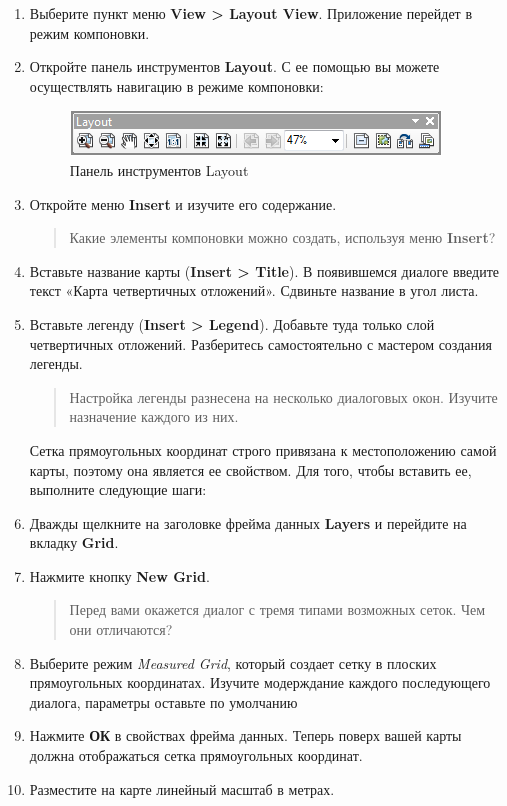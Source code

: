 \documentclass[]{book}
\theoremstyle{definition}
\theoremstyle{definition}
\theoremstyle{definition}
\theoremstyle{remark}
\begin{document}
\begin{enumerate}
\def\labelenumi{\arabic{enumi}.}
\item
  Выберите пункт меню \textbf{View \textgreater{} Layout View}.
  Приложение перейдет в режим компоновки.
\item
  Откройте панель инструментов \textbf{Layout}. С ее помощью вы можете
  осуществлять навигацию в режиме компоновки:

  \begin{figure}
  \centering
  \includegraphics{images/Ex01/image20.png}
  \caption{Панель инструментов Layout}
  \end{figure}
\item
  Откройте меню \textbf{Insert} и изучите его содержание.

  \begin{quote}
  Какие элементы компоновки можно создать, используя меню
  \textbf{Insert}?
  \end{quote}
\item
  Вставьте название карты (\textbf{Insert \textgreater{} Title}). В
  появившемся диалоге введите текст «Карта четвертичных отложений».
  Сдвиньте название в угол листа.
\item
  Вставьте легенду (\textbf{Insert \textgreater{} Legend}). Добавьте
  туда только слой четвертичных отложений. Разберитесь самостоятельно с
  мастером создания легенды.

  \begin{quote}
  Настройка легенды разнесена на несколько диалоговых окон. Изучите
  назначение каждого из них.
  \end{quote}

  Сетка прямоугольных координат строго привязана к местоположению самой
  карты, поэтому она является ее свойством. Для того, чтобы вставить ее,
  выполните следующие шаги:
\item
  Дважды щелкните на заголовке фрейма данных \textbf{Layers} и перейдите
  на вкладку \textbf{Grid}.
\item
  Нажмите кнопку \textbf{New Grid}.

  \begin{quote}
  Перед вами окажется диалог с тремя типами возможных сеток. Чем они
  отличаются?
  \end{quote}
\item
  Выберите режим \emph{Measured Grid}, который создает сетку в плоских
  прямоугольных координатах. Изучите модерждание каждого последующего
  диалога, параметры оставьте по умолчанию
\item
  Нажмите \textbf{ОК} в свойствах фрейма данных. Теперь поверх вашей
  карты должна отображаться сетка прямоугольных координат.
\item
  Разместите на карте линейный масштаб в метрах.
\end{enumerate}
\end{document}
